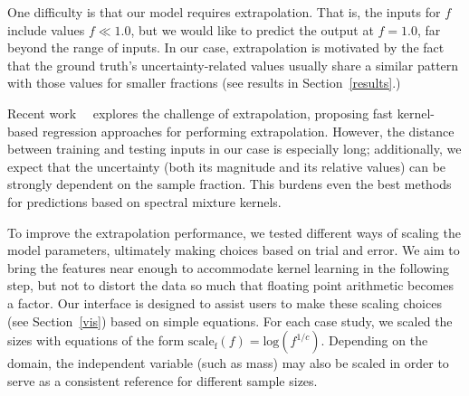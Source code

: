One difficulty is that our model requires extrapolation. That is, the inputs for $f$ include values $f \ll 1.0$, but we would like to predict the output at $f = 1.0$, far beyond the range of inputs. In our case, extrapolation is motivated by the fact that the ground truth's uncertainty-related values usually share a similar pattern with those values for smaller fractions (see results in Section~\ref{results}.)

Recent work~\cite{pmlr-v28-wilson13}~\cite{WilsonGCN14} explores the challenge of extrapolation, proposing fast kernel-based regression approaches for performing extrapolation. However, the distance between training and testing inputs in our case is especially long; additionally, we expect that the uncertainty (both its magnitude and its relative values) can be strongly dependent on the sample fraction. This burdens even the best methods for predictions based on spectral mixture kernels. 






To improve the extrapolation performance, we tested different ways of scaling the model parameters, ultimately making choices based on trial and error. We aim to bring the features near enough to accommodate kernel learning in the following step, but not to distort the data so much that floating point arithmetic becomes a factor. Our interface is designed to assist users to make these scaling choices (see Section~\ref{vis}) based on simple equations. For each case study, we scaled the sizes with equations of the form $\mathrm{scale}_{\mathrm{f}}(f) = \mathrm{log}(f^{1/c})$. Depending on the domain, the independent variable (such as mass) may also be scaled in order to serve as a consistent reference for different sample sizes.

